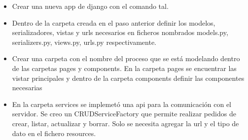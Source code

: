 \begin{itemize}
    \item Crear una nueva app de django con el comando tal.
    \item Dentro de la carpeta creada en el paso anterior definir los modelos, serializadores, 
    vistas y urls necesarios en ficheros nombrados models.py, serializers.py, views.py, urls.py respectivamente. 
    \item Crear una carpeta con el nombre del proceso que se está modelando dentro de las carpetas pages y components. 
    En la carpeta pages se encuentrar las vistar principales y dentro de la carpeta components definir las componentes 
    necesarias 
    \item En la carpeta services se implemetó una api para la comunicación con el servidor. Se creo un CRUDServiceFactory 
    que permite realizar pedidos de crear, listar, actualizar y borrar. Solo se necesita agregar la url y el tipo de dato 
    en el fichero resources. 

\end{itemize}



